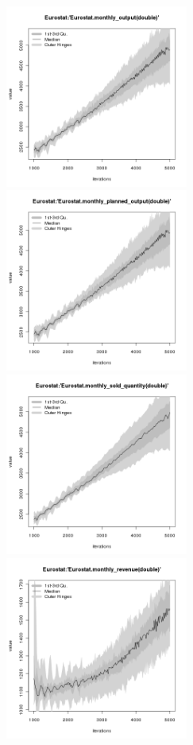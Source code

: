 \begin{figure}[H!]
\centering\leavevmode
\begin{minipage}{14cm}
\centering\leavevmode
\includegraphics[width=6cm]{./png/tax_0.10/Eurostat-monthly_output.png}
\includegraphics[width=6cm]{./png/tax_0.10/Eurostat-monthly_planned_output.png}\\
\includegraphics[width=6cm]{./png/tax_0.10/Eurostat-monthly_sold_quantity.png}
\includegraphics[width=6cm]{./png/tax_0.10/Eurostat-monthly_revenue.png}\\

\end{minipage}
\end{figure}

